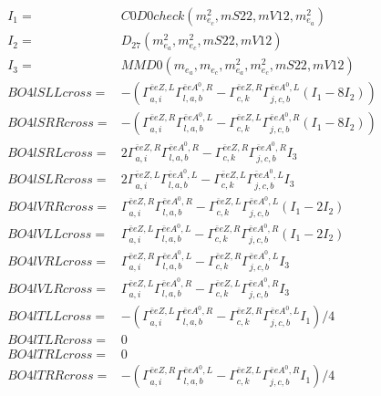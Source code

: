 \documentclass[A4,landscape]{article}
\begin{document}
\begin{align} 
I_1 = & C0D0check(m^2_{e_{{c}}}, mS22, mV12, m^2_{e_{{a}}}) \\ 
I_2 = & D_{27}(m^2_{e_{{a}}}, m^2_{e_{{c}}}, mS22, mV12) \\ 
I_3 = & MMD0(m_{e_{{a}}}, m_{e_{{c}}}, m^2_{e_{{a}}}, m^2_{e_{{c}}}, mS22, mV12) \\ 
  BO4lSLLcross= & -( \Gamma^{\bar{e}e Z ,L}_{a, i} \Gamma^{\bar{e}e A^0 ,R}_{l, a, b} - \Gamma^{\bar{e}e Z ,R} _{c, k} \Gamma^{\bar{e}e A^0 ,L}_{j, c, b} (I_1 - 8 I_2)) \\ 
  BO4lSRRcross= & -( \Gamma^{\bar{e}e Z ,R}_{a, i} \Gamma^{\bar{e}e A^0 ,L}_{l, a, b} - \Gamma^{\bar{e}e Z ,L} _{c, k} \Gamma^{\bar{e}e A^0 ,R}_{j, c, b} (I_1 - 8 I_2)) \\ 
  BO4lSRLcross= & 2  \Gamma^{\bar{e}e Z ,R}_{a, i} \Gamma^{\bar{e}e A^0 ,R}_{l, a, b} - \Gamma^{\bar{e}e Z ,R} _{c, k} \Gamma^{\bar{e}e A^0 ,R}_{j, c, b} I_3 \\ 
  BO4lSLRcross= & 2  \Gamma^{\bar{e}e Z ,L}_{a, i} \Gamma^{\bar{e}e A^0 ,L}_{l, a, b} - \Gamma^{\bar{e}e Z ,L} _{c, k} \Gamma^{\bar{e}e A^0 ,L}_{j, c, b} I_3 \\ 
  BO4lVRRcross= &  \Gamma^{\bar{e}e Z ,R}_{a, i} \Gamma^{\bar{e}e A^0 ,R}_{l, a, b} - \Gamma^{\bar{e}e Z ,L} _{c, k} \Gamma^{\bar{e}e A^0 ,L}_{j, c, b} (I_1 - 2 I_2) \\ 
  BO4lVLLcross= &  \Gamma^{\bar{e}e Z ,L}_{a, i} \Gamma^{\bar{e}e A^0 ,L}_{l, a, b} - \Gamma^{\bar{e}e Z ,R} _{c, k} \Gamma^{\bar{e}e A^0 ,R}_{j, c, b} (I_1 - 2 I_2) \\ 
  BO4lVRLcross= &  \Gamma^{\bar{e}e Z ,R}_{a, i} \Gamma^{\bar{e}e A^0 ,L}_{l, a, b} - \Gamma^{\bar{e}e Z ,R} _{c, k} \Gamma^{\bar{e}e A^0 ,L}_{j, c, b} I_3 \\ 
  BO4lVLRcross= &  \Gamma^{\bar{e}e Z ,L}_{a, i} \Gamma^{\bar{e}e A^0 ,R}_{l, a, b} - \Gamma^{\bar{e}e Z ,L} _{c, k} \Gamma^{\bar{e}e A^0 ,R}_{j, c, b} I_3 \\ 
  BO4lTLLcross= & -( \Gamma^{\bar{e}e Z ,L}_{a, i} \Gamma^{\bar{e}e A^0 ,R}_{l, a, b} - \Gamma^{\bar{e}e Z ,R} _{c, k} \Gamma^{\bar{e}e A^0 ,L}_{j, c, b} I_1)/4 \\ 
  BO4lTLRcross= & 0 \\ 
  BO4lTRLcross= & 0 \\ 
  BO4lTRRcross= & -( \Gamma^{\bar{e}e Z ,R}_{a, i} \Gamma^{\bar{e}e A^0 ,L}_{l, a, b} - \Gamma^{\bar{e}e Z ,L} _{c, k} \Gamma^{\bar{e}e A^0 ,R}_{j, c, b} I_1)/4 \\ 
\end{align} 
\end{document}
